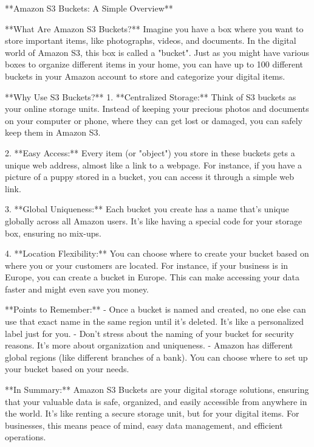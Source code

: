 **Amazon S3 Buckets: A Simple Overview**

**What Are Amazon S3 Buckets?**
Imagine you have a box where you want to store important items, like photographs, videos, and documents. In the digital world of Amazon S3, this box is called a "bucket". Just as you might have various boxes to organize different items in your home, you can have up to 100 different buckets in your Amazon account to store and categorize your digital items.

**Why Use S3 Buckets?**
1. **Centralized Storage:** Think of S3 buckets as your online storage units. Instead of keeping your precious photos and documents on your computer or phone, where they can get lost or damaged, you can safely keep them in Amazon S3.
   
2. **Easy Access:** Every item (or "object") you store in these buckets gets a unique web address, almost like a link to a webpage. For instance, if you have a picture of a puppy stored in a bucket, you can access it through a simple web link.
   
3. **Global Uniqueness:** Each bucket you create has a name that's unique globally across all Amazon users. It's like having a special code for your storage box, ensuring no mix-ups.
   
4. **Location Flexibility:** You can choose where to create your bucket based on where you or your customers are located. For instance, if your business is in Europe, you can create a bucket in Europe. This can make accessing your data faster and might even save you money.

**Points to Remember:**
- Once a bucket is named and created, no one else can use that exact name in the same region until it's deleted. It's like a personalized label just for you.
- Don’t stress about the naming of your bucket for security reasons. It's more about organization and uniqueness.
- Amazon has different global regions (like different branches of a bank). You can choose where to set up your bucket based on your needs.

**In Summary:**
Amazon S3 Buckets are your digital storage solutions, ensuring that your valuable data is safe, organized, and easily accessible from anywhere in the world. It’s like renting a secure storage unit, but for your digital items. For businesses, this means peace of mind, easy data management, and efficient operations.
